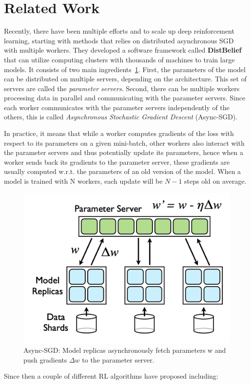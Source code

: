 \section{Related Work}

Recently, there have been multiple efforts and to scale up deep reinforcement learning, starting with methods that relies on distributed asynchronous SGD~\parencite{dean2012large} with multiple workers. They developed a software framework
called \textbf{DistBelief} that can utilize computing clusters with thousands of machines to train large models. It consists of two main ingredients~\ref{fig:sgd}. First, the parameters of the model can be distributed on multiple servers, depending on the architecture. This set of servers are called the \textit{parameter
servers}. Second, there can be multiple workers processing data in parallel and communicating with the parameter servers. Since each worker communicates with the parameter servers independently of the others, this is
called \textit{Asynchronous Stochastic Gradient Descent} (Async-SGD).

In practice, it means that while a worker computes gradients of the loss with respect to its parameters on a given mini-batch, other workers also interact with the parameter servers and thus potentially update its parameters, hence when a worker sends back its gradients to the parameter server, these gradients are usually computed w.r.t. the parameters of an old version of the model. When a model is trained with N workers, each update will be $N-1$ steps old on average.

\begin{figure}[tph]
    \centering
    \includegraphics[width=0.5\linewidth]{figures/algos/sgd.png}
    \caption{Async-SGD: Model replicas asynchronously fetch parameters w and push gradients \(\Delta w\) to the parameter server.}
    \label{fig:sgd}
\end{figure}


Since then a couple of different RL algorithms have proposed including:

